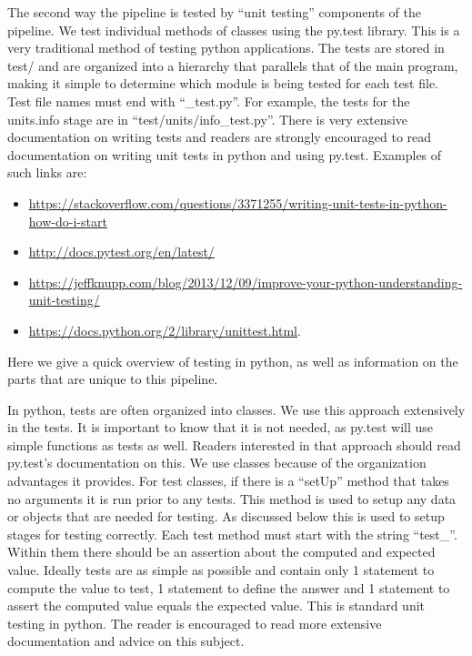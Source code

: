 The second way the pipeline is tested by ``unit testing'' components of the
pipeline. We test individual methods of classes using the py.test library. This
is a very traditional method of testing python applications. The tests are
stored in test/ and are organized into a hierarchy that parallels that of the
main program, making it simple to determine which module is being tested for
each test file. Test file names must end with ``\_test.py''. For example, the
tests for the units.info stage are in ``test/units/info\_test.py''.  There is very
extensive documentation on writing tests and readers are strongly encouraged to
read documentation on writing unit tests in python and using py.test. Examples
of such links are: 
\begin{itemize}
  \item \href{https://stackoverflow.com/questions/3371255/writing-unit-tests-in-python-how-do-i-start}{https://stackoverflow.com/questions/3371255/writing-unit-tests-in-python-how-do-i-start}
  \item \href{http://docs.pytest.org/en/latest/}{http://docs.pytest.org/en/latest/}
  \item \href{https://jeffknupp.com/blog/2013/12/09/improve-your-python-understanding-unit-testing/}{https://jeffknupp.com/blog/2013/12/09/improve-your-python-understanding-unit-testing/}
  \item \href{https://docs.python.org/2/library/unittest.html}{https://docs.python.org/2/library/unittest.html}.
\end{itemize}

Here we give a quick overview of testing in python, as well as information on
the parts that are unique to this pipeline.

In python, tests are often organized into classes. We use this approach
extensively in the tests. It is important to know that it is not needed, as
py.test will use simple functions as tests as well. Readers interested in that
approach should read py.test's documentation on this. We use classes because of
the organization advantages it provides. For test classes, if there is a ``setUp''
method that takes no arguments it is run prior to any tests. This method is used
to setup any data or objects that are needed for testing. As discussed below
this is used to setup stages for testing correctly. Each test method must start
with the string ``test\_''. Within them there should be an assertion about the
computed and expected value. Ideally tests are as simple as possible and contain
only 1 statement to compute the value to test, 1 statement to define the answer
and 1 statement to assert the computed value equals the expected value. This is
standard unit testing in python. The reader is encouraged to read more extensive
documentation and advice on this subject.

